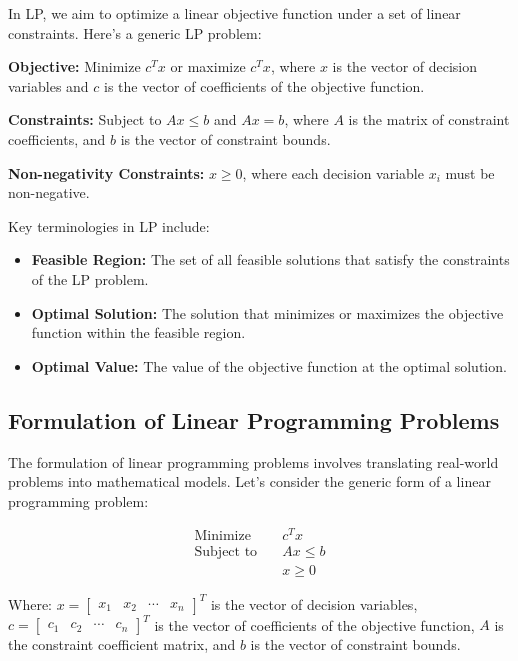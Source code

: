 \documentclass[12pt]{book} %
\begin{document}
In LP, we aim to optimize a linear objective function under a set of linear constraints. Here's a generic LP problem:

\textbf{Objective:} Minimize \( c^Tx \) or maximize \( c^Tx \), where \( x \) is the vector of decision variables and \( c \) is the vector of coefficients of the objective function.

\textbf{Constraints:} Subject to \( Ax \leq b \) and \( Ax = b \), where \( A \) is the matrix of constraint coefficients, and \( b \) is the vector of constraint bounds.

\textbf{Non-negativity Constraints:} \( x \geq 0 \), where each decision variable \( x_i \) must be non-negative.

Key terminologies in LP include:

\begin{itemize}
    \item \textbf{Feasible Region:} The set of all feasible solutions that satisfy the constraints of the LP problem.
    \item \textbf{Optimal Solution:} The solution that minimizes or maximizes the objective function within the feasible region.
    \item \textbf{Optimal Value:} The value of the objective function at the optimal solution.
\end{itemize}


\subsection{Formulation of Linear Programming Problems}
The formulation of linear programming problems involves translating real-world problems into mathematical models. Let's consider the generic form of a linear programming problem:

\[
\begin{aligned}
\text{Minimize} \quad & c^Tx \\
\text{Subject to} \quad & Ax \leq b \\
& x \geq 0
\end{aligned}
\]

Where:
\( x = \begin{bmatrix} x_1 & x_2 & \cdots & x_n \end{bmatrix}^T \) is the vector of decision variables,
\( c = \begin{bmatrix} c_1 & c_2 & \cdots & c_n \end{bmatrix}^T \) is the vector of coefficients of the objective function,
\( A \) is the constraint coefficient matrix, and
\( b \) is the vector of constraint bounds.
\end{document}
